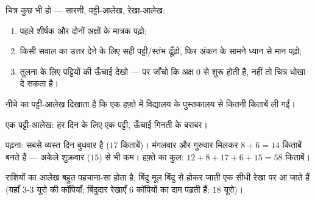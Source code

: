 \begin{method}[सारणी या आलेख पढ़ना]\label{met:g6:propdata:read}
चित्र कुछ भी हो --- सारणी, पट्टी-आलेख, रेखा-आलेख:
\begin{enumerate}
  \item पहले शीर्षक और दोनों अक्षों के मात्रक पढ़ो;
  \item किसी सवाल का उत्तर देने के लिए सही पट्टी/स्तंभ ढूँढ़ो,
        फिर अंकन के सामने ध्यान से मान पढ़ो;
  \item तुलना के लिए पट्टियों की ऊँचाई देखो --- पर जाँचो कि अक्ष
        $0$ से शुरू होती है, नहीं तो चित्र धोखा दे सकता है।
\end{enumerate}
\end{method}

\begin{example}\label{ex:g6:propdata:chart}
नीचे का पट्टी-आलेख दिखाता है कि एक हफ़्ते में विद्यालय के
पुस्तकालय से कितनी किताबें ली गईं।

\begin{omfigure}

{\small एक पट्टी-आलेख: हर दिन के लिए एक पट्टी, ऊँचाई गिनती के बराबर।}
\end{omfigure}

पढ़ना: सबसे व्यस्त दिन बुधवार है ($17$ किताबें)। मंगलवार और
गुरुवार मिलकर $8 + 6 = 14$ किताबें बनते हैं --- अकेले शुक्रवार
($15$) से भी कम। हफ़्ते का कुल:
$12 + 8 + 17 + 6 + 15 = 58$ किताबें।
\end{example}

\begin{omfigure}

{\small {} राशियों का आलेख बहुत पहचाना-सा होता है: बिंदु
मूल बिंदु से होकर जाती एक सीधी रेखा पर आ जाते हैं (यहाँ
$3$-$3$ यूरो की कॉपियाँ; बिंदुदार रेखाएँ $6$ कॉपियों का दाम
पढ़ती हैं: $18$ यूरो)।}
\end{omfigure}

